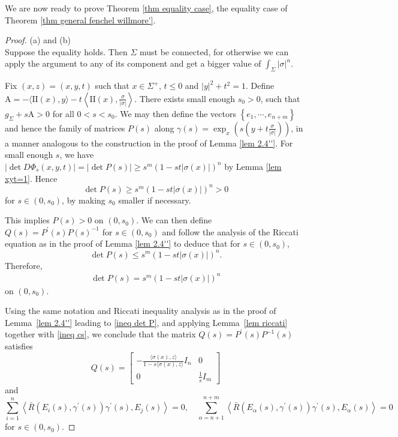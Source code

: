 \documentclass[11pt, reqno]{amsart}
\numberwithin{equation}{section}
\begin{document}
We are now ready to prove Theorem \ref{thm equality case}, the equality case of Theorem \ref{thm general fenchel willmore'}.
\begin{proof}

\noindent(a) and (b) \\
Suppose the equality holds. Then $\Sigma$ must be connected, for otherwise we can apply the argument to any of its component and get a bigger value of $\int_\Sigma|\sigma|^n$.

Fix $(x, z)=(x, y, t)$ such that $x\in \Sigma^+$, $t\le 0$ and $|y|^2+t^2=1$.
Define $\mathrm{A}=-\langle\mathrm{II}(x), y\rangle-t\left\langle\mathrm{II}(x), \frac{\sigma}{|\sigma|}\right\rangle$. There exists small enough $s_0>0$, such that $g_{\Sigma}+s \mathrm{A}>0$ for all $0<s<s_0$. We may then define the vectors $\left\{e_1, \cdots, e_{n+m}\right\}$ and hence the family of matrices $P(s)$ along ${\gamma}(s)=\exp_{ x }\left(s\left(y+t\frac{\sigma}{|\sigma|}\right)\right)$, in a manner analogous to the construction in the proof of Lemma \ref{lem 2.4''}.
For small enough $s$, we have $\left|\det D \Phi_s(x, y, t)\right|= |\det P(s)| \ge s^m\left(1-s t|\sigma(x)|\right)^n$ by Lemma \ref{lem xyt=1}. Hence
$$
\det P(s) \ge s^m\left(1-s t|\sigma(x)|\right)^n>0
$$
for $s \in\left(0, s_0\right)$, by making $s_0$ smaller if necessary.

This implies $P(s)>0$ on $(0, s_0)$. We can then define $Q(s)= P^{\prime}(s)P(s)^{-1}$ for $s \in\left(0, s_0\right)$ and follow the analysis of the Riccati equation as in the proof of Lemma \ref{lem 2.4''} to deduce that for $s\in(0, s_0)$,
\begin{equation}\label{ineq det P}
\det P(s) \le s^m(1-s t|\sigma(x)|)^n.
\end{equation}
Therefore,
\begin{equation*}
\begin{aligned}
\det P(s) =s^m(1-s t|\sigma(x)|)^n
\end{aligned}
\end{equation*}
on $(0, s_0)$.

Using the same notation and Riccati inequality analysis as in the proof of Lemma~\ref{lem 2.4''} leading to \eqref{ineq det P}, and applying Lemma~\ref{lem riccati} together with \eqref{ineq cs}, we conclude that the matrix $Q(s)=P^{\prime}(s) P^{-1}(s)$ satisfies
\begin{equation}\label{eq Q}
Q(s)=\begin{bmatrix}
-\frac{\langle\sigma(x), z\rangle}{1-s\langle\sigma(x), z\rangle}I_n& 0\\
0& \frac{1}{s}I_m
\end{bmatrix}
\end{equation}
and
\begin{equation}\label{eq R}
\sum_{i=1}^n\left\langle\bar{R}\left(E_i(s), {\gamma}^{\prime}(s)\right) {\gamma}^{\prime}(s), E_j(s)\right\rangle=0, \quad
\sum_{\alpha=n+1}^{n+m}\left\langle\bar{R}\left(E_\alpha(s), {\gamma}^{\prime}(s)\right) {\gamma}^{\prime}(s), E_\alpha(s)\right\rangle=0
\end{equation}
for $s\in(0, s_0)$.


\end{proof}
\end{document}
